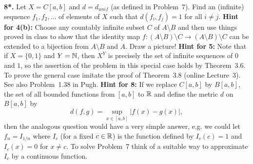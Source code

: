 \documentclass[11pt]{amsart}
\begin{document}
{\bf 8*.} Let $X=C[a,b]$ and $d=d_{unif}$ (as defined in Problem~7). Find an (infinite) sequence $f_1,f_2,\ldots$ of elements of $X$ such that $d(f_i,f_j)=1$ for all $i\neq j$.
\newpage
{\bf Hint for 4(b):} Choose any countably infinite subset $C$ of $A\setminus B$ and then
use things proved in class to show that the identity map 
$f:(A\setminus B)\setminus C\to (A\setminus B)\setminus C$ can be extended
to a bijection from $A\setminus B$ and $A$. Draw a picture!
\newpage
{\bf Hint for 5:} Note that if $X=\{0,1\}$ and $Y={\mathbb N}$, then $X^Y$ is precisely the set of infinite sequences of $0$ and $1$,
so the assertion of the problem in this special case holds by Theorem~3.6. To prove the general case imitate the proof of 
Theorem~3.8 (online Lecture~3). See also Problem~1.38 in Pugh.
\newpage
{\bf Hint for 8:} If we replace $C[a,b]$ by $B[a,b]$, the set of all bounded functions from $[a,b]$ to ${\mathbb R}$ and define the metric $d$ on $B[a,b]$ by $$d(f,g)=\sup\limits_{x\in [a,b]}|f(x)-g(x)|,$$ then the analogous question would have a very simple answer, e.g. we could let $f_n=I_{1/n}$ where $I_c$ (for a fixed $c\in{\mathbb R}$) is the function defined by $I_c(c)=1$ and $I_c(x)=0$ for $x\neq c$. To solve  Problem~7 think of a suitable way to approximate $I_c$ by a continuous function. 
\end{document}
